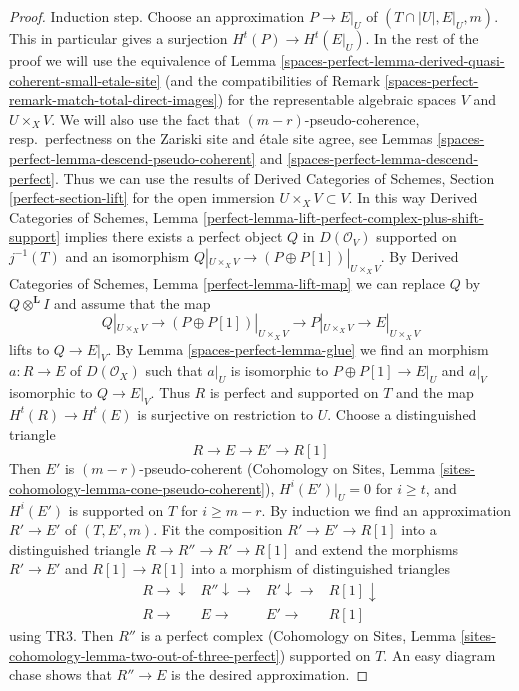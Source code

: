 \begin{proof}
\medskip\noindent
Induction step. Choose an approximation $P \to E|_U$ of
$(T \cap |U|, E|_U, m)$. This in particular gives a surjection
$H^t(P) \to H^t(E|_U)$.
In the rest of the proof we will use the equivalence of
Lemma \ref{spaces-perfect-lemma-derived-quasi-coherent-small-etale-site}
(and the compatibilities of Remark \ref{spaces-perfect-remark-match-total-direct-images})
for the representable algebraic spaces $V$ and $U \times_X V$.
We will also use the fact that $(m - r)$-pseudo-coherence,
resp.\ perfectness on the Zariski site and \'etale site agree, see
Lemmas \ref{spaces-perfect-lemma-descend-pseudo-coherent} and
\ref{spaces-perfect-lemma-descend-perfect}.
Thus we can use the results of
Derived Categories of Schemes, Section \ref{perfect-section-lift}
for the open immersion $U \times_X V \subset V$. In this way
Derived Categories of Schemes,
Lemma \ref{perfect-lemma-lift-perfect-complex-plus-shift-support}
implies there exists a perfect object $Q$ in $D(\mathcal{O}_V)$
supported on $j^{-1}(T)$ and an isomorphism
$Q|_{U \times_X V} \to (P \oplus P[1])|_{U \times_X V}$. By
Derived Categories of Schemes, Lemma \ref{perfect-lemma-lift-map}
we can replace $Q$ by $Q \otimes^\mathbf{L} I$
and assume that the map
$$
Q|_{U \times_X V} \longrightarrow
(P \oplus P[1])|_{U \times_X V} \longrightarrow
P|_{U \times_X V} \longrightarrow E|_{U \times_X V}
$$
lifts to $Q \to E|_V$. By Lemma \ref{spaces-perfect-lemma-glue}
we find an morphism $a : R \to E$ of $D(\mathcal{O}_X)$
such that $a|_U$ is isomorphic to $P \oplus P[1] \to E|_U$
and $a|_V$ isomorphic to $Q \to E|_V$.
Thus $R$ is perfect and supported on $T$
and the map $H^t(R) \to H^t(E)$ is surjective on restriction to $U$.
Choose a distinguished triangle
$$
R \to E \to E' \to R[1]
$$
Then $E'$ is $(m - r)$-pseudo-coherent
(Cohomology on Sites, Lemma \ref{sites-cohomology-lemma-cone-pseudo-coherent}),
$H^i(E')|_U = 0$ for $i \geq t$, and
$H^i(E')$ is supported on $T$ for $i \geq m - r$.
By induction we find an approximation $R' \to E'$
of $(T, E', m)$. Fit the composition $R' \to E' \to R[1]$
into a distinguished triangle $R \to R'' \to R' \to R[1]$
and extend the morphisms $R' \to E'$ and $R[1] \to R[1]$ into
a morphism of distinguished triangles
$$
\begin{array}{cccc}R \longrightarrow\downarrow & R'' \downarrow\longrightarrow & R' \downarrow\longrightarrow & R[1] \downarrow \\ R \longrightarrow & E \longrightarrow & E' \longrightarrow & R[1]\end{array}
$$
using TR3. Then $R''$ is a perfect complex
(Cohomology on Sites, Lemma
\ref{sites-cohomology-lemma-two-out-of-three-perfect})
supported on $T$. An easy diagram chase shows that $R'' \to E$ is the desired
approximation.
\end{proof}

